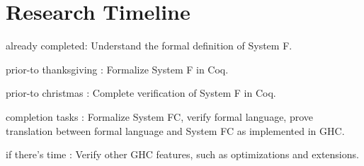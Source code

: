\documentclass{sig-alternate}
\begin{document}
\section{Research Timeline}
\label{sec:research_timeline}
\begin{itemize*}
	\item {\sc already completed}: Understand the formal definition of System F.
	\item {\sc prior-to thanksgiving} : Formalize System F in Coq.
	\item {\sc prior-to christmas} : Complete verification of System F in Coq.
	\item {\sc completion tasks} : Formalize System FC, verify formal language, prove translation between formal language and System FC as implemented in GHC.
	\item {\sc if there's time} : Verify other GHC features, such as optimizations and extensions.
\end{itemize*}


\vspace{175pt}
\end{document}
